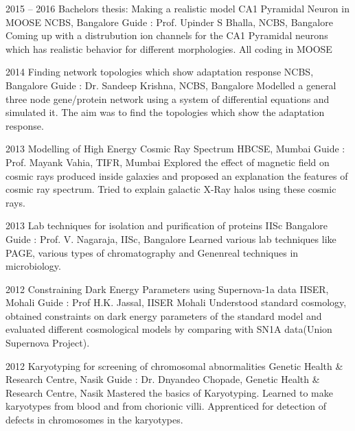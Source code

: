 \documentclass[11pt,print]{friggeri-cv}%
\begin{document}
\begin{entrylist}
  \entry
    {2015 -- 2016}
    {Bachelors thesis: Making a realistic model CA1 Pyramidal Neuron in MOOSE}
    {NCBS, Bangalore}
    {Guide : Prof. Upinder S Bhalla, NCBS, Bangalore}
    {Coming up with a distrubution ion channels for the CA1 Pyramidal neurons which has realistic behavior for different morphologies. All coding in MOOSE}
\end{entrylist}
\begin{entrylist}
  \entry
    {2014}
    {Finding network topologies which show adaptation response}
    {NCBS, Bangalore}
    {Guide : Dr. Sandeep Krishna, NCBS, Bangalore}
    {Modelled a general three node gene/protein network using a system of differential equations and simulated it. The aim was to find the topologies which show the adaptation response.}
\end{entrylist}
\begin{entrylist}

  \entry
    {2013}
    {Modelling of High Energy Cosmic Ray Spectrum}
    {HBCSE, Mumbai}
    {Guide : Prof. Mayank Vahia, TIFR, Mumbai}
    {Explored the effect of magnetic field on cosmic rays produced inside galaxies and proposed an explanation the features of cosmic ray spectrum. Tried to explain galactic X-Ray halos using these cosmic rays.}
\end{entrylist}
\begin{entrylist}
    
  \entry
    {2013}
    {Lab techniques for isolation and purification of proteins}
    {IISc Bangalore}
    {
    Guide : Prof. V. Nagaraja, IISc, Bangalore}
    {Learned various lab techniques like PAGE, various types of chromatography and Genenreal techniques in microbiology.}    
\end{entrylist}
\begin{entrylist}

  \entry
    {2012}
    {Constraining Dark Energy Parameters using Supernova-1a data}
    {IISER, Mohali}
    {Guide : Prof H.K. Jassal, IISER Mohali}
    {Understood standard cosmology,  obtained constraints on dark energy parameters of the standard model and evaluated different cosmological models by comparing with SN1A data(Union Supernova Project).
    }
    
\end{entrylist}
\begin{entrylist}


  \entry
    {2012}
    {Karyotyping for screening of chromosomal abnormalities}
    {Genetic Health \& Research Centre, Nasik}
    {
    Guide : Dr. Dnyandeo Chopade, Genetic Health \& Research Centre, Nasik}
    {
    Mastered the basics of Karyotyping. Learned to make karyotypes from blood and from chorionic villi.  Apprenticed for  detection of defects in chromosomes in the karyotypes.
    }
    \end{entrylist}
\end{document}
